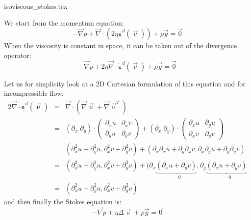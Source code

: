 \begin{flushright} {\tiny {\color{gray} isoviscous\_stokes.tex}} \end{flushright}

We start from the momentum equation:
\begin{equation}
-{\vec \nabla}p + {\vec \nabla}\cdot (2 \eta \dot{\bm \varepsilon}^d(\vec\upnu) ) + \rho {\vec g} = \vec{0}
\end{equation}
When the viscosity is constant in space, it can be taken out of the divergence operator:
\begin{equation}
-{\vec \nabla}p + 2 \eta {\vec \nabla}\cdot \dot{\bm \varepsilon}^d(\vec\upnu)  + \rho {\vec g} = \vec{0}
\end{equation}

Let us for simplicity look at a 2D Cartesian formulation of this equation and for incompressible flow:
\begin{eqnarray}
2 {\vec \nabla}\cdot \dot{\bm \varepsilon}^d (\vec\upnu)
&=& \vec\nabla \cdot \left( \vec\nabla \vec\upnu + \vec\nabla \vec\upnu ^T \right) \nonumber\\ 
&=& 
(\partial_x \; \partial_y) \cdot
\left(
\begin{array}{cc}
\partial_x u & \partial_x v \\
\partial_y u & \partial_y v 
\end{array}
\right) + 
(\partial_x \; \partial_y) \cdot
\left(
\begin{array}{cc}
\partial_x u & \partial_y u \\
\partial_x v & \partial_y v 
\end{array}
\right) \nonumber\\
&=&( \partial_x^2 u + \partial_y^2 u , \partial_x^2 v + \partial_y^2 v )
+(\partial_x \partial_x u + \partial_y \partial_x v , 
 \partial_x \partial_y u + \partial_y \partial_y v)  \nonumber\\
&=&( \partial_x^2 u + \partial_y^2 u , \partial_x^2 v + \partial_y^2 v )
+(\partial_x \underbrace{(\partial_x u + \partial_y v)}_{=0} , 
  \partial_y \underbrace{(\partial_x u + \partial_y v)}_{=0}  \nonumber\\
&=&( \partial_x^2 u + \partial_y^2 u , \partial_x^2 v + \partial_y^2 v )
\end{eqnarray}
and then finally the Stokes equation is:
\begin{equation}
-\vec\nabla p  + \eta \Delta \vec \upnu + \rho \vec g = \vec{0}
\end{equation}

